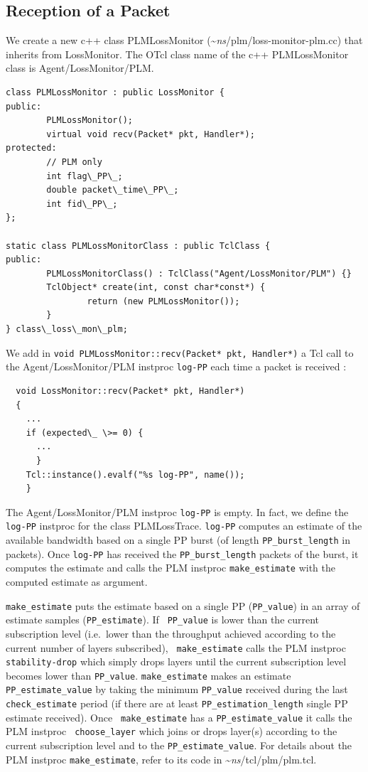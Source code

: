{\subsection{Reception of a Packet}
\label{sec:PLMReception-Packet}
We create a new c++ class PLMLossMonitor (\textasciitilde\emph{ns}/{plm/loss-monitor-plm.cc}) that
inherits from LossMonitor. The OTcl class name of the c++ PLMLossMonitor class is
Agent/LossMonitor/PLM.
\begin{verbatim}
class PLMLossMonitor : public LossMonitor {
public:
        PLMLossMonitor();
        virtual void recv(Packet* pkt, Handler*);
protected:
        // PLM only
        int flag\_PP\_;
        double packet\_time\_PP\_;
        int fid\_PP\_;
};

static class PLMLossMonitorClass : public TclClass {
public:
        PLMLossMonitorClass() : TclClass("Agent/LossMonitor/PLM") {}
        TclObject* create(int, const char*const*) {
                return (new PLMLossMonitor());
        }
} class\_loss\_mon\_plm;

\end{verbatim}

We add in {\tt void PLMLossMonitor::recv(Packet* pkt, Handler*)} a Tcl call to the
  Agent/LossMonitor/PLM instproc {\tt log-PP} each time a packet is received :
\begin{verbatim}
  void LossMonitor::recv(Packet* pkt, Handler*)
  {
    ...
    if (expected\_ \>= 0) {
      ...
      }
    Tcl::instance().evalf("%s log-PP", name());
    }
\end{verbatim}

The Agent/LossMonitor/PLM instproc {\tt log-PP} is empty. In fact, we define the {\tt
  log-PP} instproc for the class PLMLossTrace. {\tt log-PP}
computes an estimate of the available bandwidth based on a single PP burst (of
length {\tt PP\_burst\_length} in packets). Once {\tt log-PP} has received the 
  {\tt PP\_burst\_length} packets of the burst, it computes the estimate and
  calls the PLM instproc {\tt make\_estimate} with the computed estimate as
  argument. 

{\tt make\_estimate} puts the estimate based on a single PP
({\tt PP\_value}) in an array of  estimate samples ({\tt PP\_estimate}). If {\tt
  PP\_value} is lower than the current subscription level (i.e.~lower than the
throughput achieved according to the current number of layers subscribed), {\tt
  make\_estimate} calls the PLM instproc {\tt stability-drop} which simply drops
layers until the current subscription level becomes lower than {\tt PP\_value}.
{\tt make\_estimate} makes an estimate {\tt PP\_estimate\_value} by taking the
minimum {\tt PP\_value} received during the last {\tt check\_estimate} period
(if there are at
least {\tt PP\_estimation\_length} single PP estimate received). Once {\tt
  make\_estimate} has a {\tt PP\_estimate\_value} it calls the PLM instproc {\tt
  choose\_layer} which joins or drops layer(s) according to the current subscription
level and to the {\tt PP\_estimate\_value}. For details about the PLM instproc
{\tt make\_estimate}, refer to its code in \textasciitilde\emph{ns}/{tcl/plm/plm.tcl}.



}

